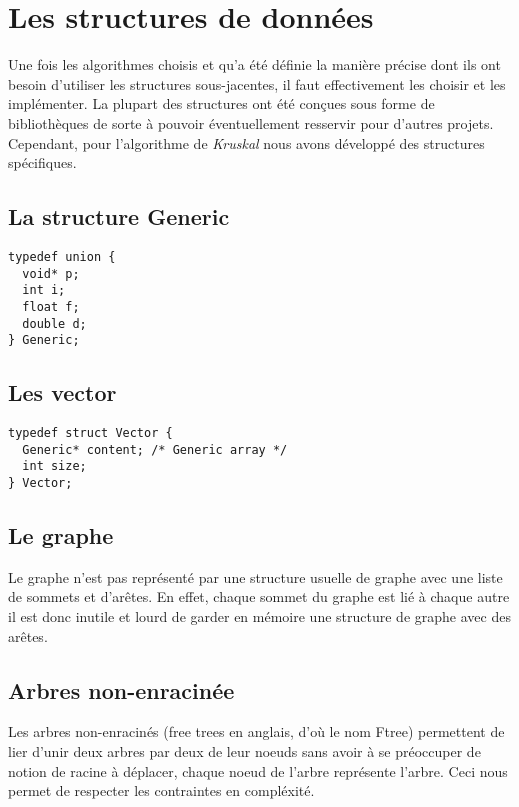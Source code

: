 \documentclass[a4paper]{article}
\begin{document}
\section{Les structures de données}
\label{se:structures}

Une fois les algorithmes choisis et qu'a été définie la manière précise dont ils ont besoin d'utiliser les structures sous-jacentes, il faut effectivement les choisir et les implémenter. La plupart des structures ont été conçues sous forme de bibliothèques de sorte à pouvoir éventuellement resservir pour d'autres projets. Cependant, pour l'algorithme de \emph{Kruskal} nous avons développé des structures spécifiques.

\subsection{La structure Generic}

\begin{verbatim}
typedef union {
  void* p;
  int i;
  float f;
  double d;
} Generic;
\end{verbatim}

\subsection{Les vector}


\begin{verbatim}
typedef struct Vector {
  Generic* content; /* Generic array */
  int size;
} Vector;
\end{verbatim}

\subsection{Le graphe}

Le graphe n'est pas représenté par une structure usuelle de graphe avec une liste de sommets et d'arêtes. En effet, chaque sommet du graphe est lié à chaque autre il est donc inutile et lourd de garder en mémoire une structure de graphe avec des arêtes.

\subsection{Arbres non-enracinée}

Les arbres non-enracinés (free trees en anglais, d'où le nom Ftree) permettent de lier d'unir deux arbres par deux de leur noeuds sans avoir à se préoccuper de notion de racine à déplacer, chaque noeud de l'arbre représente l'arbre. Ceci nous permet de respecter les contraintes en compléxité. 
\end{document}
